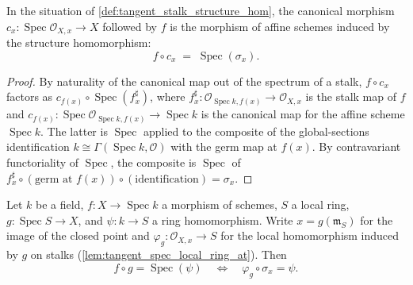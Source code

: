 \begin{lemma}\leanok
  \label{lem:tangent_from_spec_stalk_over}
  In the situation of \cref{def:tangent_stalk_structure_hom}, the
  canonical morphism
  \(c_x : \operatorname{Spec} \mathcal O_{X,x} \to X\) followed by \(f\)
  is the morphism of affine schemes induced by the structure
  homomorphism:
  \[
    f \circ c_x \;=\; \operatorname{Spec}(\sigma_x).
  \]
\end{lemma}

\begin{proof}\leanok
  By naturality of the canonical map out of the spectrum of a stalk,
  \(f \circ c_x\) factors as
  \(c_{f(x)} \circ \operatorname{Spec}(f^\sharp_x)\), where
  \(f^\sharp_x : \mathcal O_{\operatorname{Spec} k, f(x)} \to \mathcal O_{X,x}\)
  is the stalk map of \(f\) and
  \(c_{f(x)} : \operatorname{Spec} \mathcal O_{\operatorname{Spec} k, f(x)}
  \to \operatorname{Spec} k\) is the canonical map for the affine scheme
  \(\operatorname{Spec} k\). The latter is
  \(\operatorname{Spec}\) applied to the composite of the
  global-sections identification
  \(k \cong \Gamma(\operatorname{Spec} k, \mathcal O)\) with the germ
  map at \(f(x)\). By contravariant functoriality of
  \(\operatorname{Spec}\), the composite is
  \(\operatorname{Spec}\) of
  \(f^\sharp_x \circ (\text{germ at } f(x)) \circ (\text{identification})
  = \sigma_x\).
\end{proof}

\begin{lemma}\leanok
  \label{lem:tangent_over_triangle_iff}
  Let \(k\) be a field, \(f : X \to \operatorname{Spec} k\) a morphism
  of schemes, \(S\) a local ring, \(g : \operatorname{Spec} S \to X\),
  and \(\psi : k \to S\) a ring homomorphism. Write
  \(x = g(\mathfrak m_S)\) for the image of the closed point and
  \(\varphi_g : \mathcal O_{X,x} \to S\) for the local homomorphism
  induced by \(g\) on stalks
  (\cref{lem:tangent_spec_local_ring_at}). Then
  \[
    f \circ g = \operatorname{Spec}(\psi)
    \quad\Longleftrightarrow\quad
    \varphi_g \circ \sigma_x = \psi .
  \]
\end{lemma}

